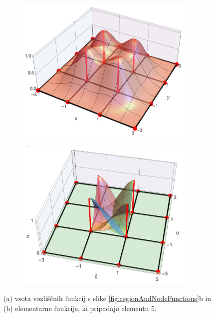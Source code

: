 \begin{figure}[ht]
    \begin{subfigure}[b]{0.48\textwidth}
        \centering
        \includegraphics[width=0.94\textwidth]{Slike/sumOfNodeFs.png}
        \vspace{6mm}
        \caption{}
    \end{subfigure}
    \begin{subfigure}[b]{0.48\textwidth}
        \centering
        \includegraphics[width=0.94\textwidth]{Slike/undeformedShapeFsFar.png}
        \caption{}
    \end{subfigure}
    \caption{(a) vsota vozliščnih funkcij s slike \ref{fig:regionAndNodeFunctions}b in (b) elementarne funkcije, ki pripadajo elementu 5.}
    \label{fig:sumAndShapeFunctions}
\end{figure}

